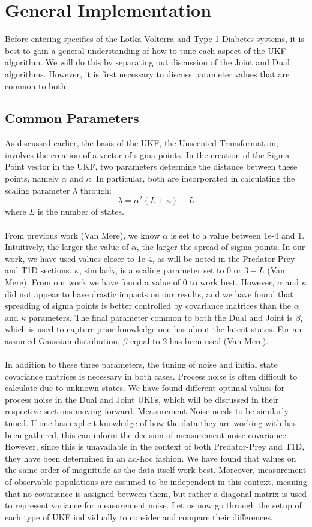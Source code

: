 \section{General Implementation}
Before entering specifics of the Lotka-Volterra and Type 1 Diabetes systems, it is best to gain a general understanding of how to tune each aspect of the UKF algorithm. We will do this by separating out discussion of the Joint and Dual algorithms. However, it is first necessary to discuss parameter values that are common to both.

\subsection{Common Parameters}
As discussed earlier, the basis of the UKF, the Unscented Transformation, involves the creation of a vector of sigma points. In the creation of the Sigma Point vector in the UKF, two parameters determine the distance between these points, namely $\alpha$ and $\kappa$. In particular, both are incorporated in calculating the scaling parameter $\lambda$ through:
$$\lambda = \alpha^2 (L + \kappa) - L$$
where $L$ is the number of states.\\
\\

From previous work (Van Mere), we know $\alpha$ is set to a value between 1e-4 and 1. Intuitively, the larger the value of $\alpha$, the larger the spread of sigma points. In our work, we have used values closer to 1e-4, as will be noted in the Predator Prey and T1D sections. $\kappa$, similarly, is a scaling parameter set to 0 or $3 - L$ (Van Mere). From our work we have found a value of 0 to work best. However, $\alpha$ and $\kappa$ did not appear to have drastic impacts on our results, and we have found that spreading of sigma points is better controlled by covariance matrices than the $\alpha$ and $\kappa$ parameters. The final parameter common to both the Dual and Joint is $\beta$, which is used to capture prior knowledge one has about the latent states. For an assumed Gaussian distribution, $\beta$ equal to 2 has been used (Van Mere).\\
\\
In addition to these three parameters, the tuning of noise and initial state covariance matrices is necessary in both cases. Process noise is often difficult to calculate due to unknown states. We have found different optimal values for process noise in the Dual and Joint UKFs, which will be discussed in their respective sections moving forward. Measurement Noise needs to be similarly tuned. If one has explicit knowledge of how the data they are working with has been gathered, this can inform the decision of measurement noise covariance. However, since this is unavailable in the context of both Predator-Prey and T1D, they have been determined in an ad-hoc fashion. We have found that values on the same order of magnitude as the data itself work best. Moreover, measurement of observable populations are assumed to be independent in this context, meaning that no covariance is assigned between them, but rather a diagonal matrix is used to represent variance for measurement noise. Let us now go through the setup of each type of UKF individually to consider and compare their differences.



